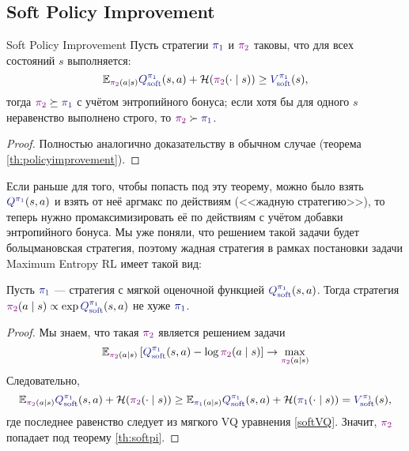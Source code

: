 \subsection{Soft Policy Improvement}

\begin{theoremBox}[label=th:softpi]{Soft Policy Improvement}
Пусть стратегии $\textcolor{ChadBlue}{\pi_1}$ и $\textcolor{ChadPurple}{\pi_2}$ таковы, что для всех состояний $s$ выполняется:
$$\E_{\textcolor{ChadPurple}{\pi_2}(a \mid s)} \textcolor{ChadBlue}{Q^{\pi_1}_{\soft}}(s, a) + \entropy(\textcolor{ChadPurple}{\pi_2}(\cdot \mid s)) \ge \textcolor{ChadBlue}{V^{\pi_1}_{\soft}}(s),$$
тогда $\textcolor{ChadPurple}{\pi_2} \succeq \textcolor{ChadBlue}{\pi_1}$ с учётом энтропийного бонуса; если хотя бы для одного $s$ неравенство выполнено строго, то $\textcolor{ChadPurple}{\pi_2} \succ \textcolor{ChadBlue}{\pi_1}$.
\begin{proof}
Полностью аналогично доказательству в обычном случае (теорема \ref{th:policyimprovement}).
\end{proof}
\end{theoremBox}

Если раньше для того, чтобы попасть под эту теорему, можно было взять $\textcolor{ChadBlue}{Q^{\pi_1}}(s, a)$ и взять от неё аргмакс по действиям (<<жадную стратегию>>), то теперь нужно промаксимизировать её по действиям с учётом добавки энтропийного бонуса. Мы уже поняли, что решением такой задачи будет больцмановская стратегия, поэтому жадная стратегия в рамках постановки задачи Maximum Entropy RL имеет такой вид:

\begin{theorem}
Пусть $\textcolor{ChadBlue}{\pi_1}$ --- стратегия с мягкой оценочной функцией $\textcolor{ChadBlue}{Q^{\pi_1}_{\soft}}(s, a)$. Тогда стратегия $\textcolor{ChadPurple}{\pi_2}(a \mid s) \propto \exp \textcolor{ChadBlue}{Q^{\pi_1}_{\soft}}(s, a)$ не хуже $\textcolor{ChadBlue}{\pi_1}$.
\begin{proof}
Мы знаем, что такая $\textcolor{ChadPurple}{\pi_2}$ является решением задачи
$$\E_{\textcolor{ChadPurple}{\pi_2}(a \mid s)} \left[ \textcolor{ChadBlue}{Q^{\pi_1}_{\soft}}(s, a) - \log \textcolor{ChadPurple}{\pi_2}(a \mid s) \right] \to \max\limits_{\textcolor{ChadPurple}{\pi_2}(a \mid s)}
$$
Следовательно,
$$\E_{\textcolor{ChadPurple}{\pi_2}(a \mid s)} \textcolor{ChadBlue}{Q^{\pi_1}_{\soft}}(s, a) + \entropy(\textcolor{ChadPurple}{\pi_2}(\cdot \mid s)) \ge \E_{\textcolor{ChadBlue}{\pi_1}(a \mid s)} \textcolor{ChadBlue}{Q^{\pi_1}_{\soft}}(s, a) + \entropy(\textcolor{ChadBlue}{\pi_1}(\cdot \mid s)) = \textcolor{ChadBlue}{V^{\pi_1}_{\soft}}(s),$$
где последнее равенство следует из мягкого VQ уравнения \eqref{softVQ}. Значит, $\textcolor{ChadPurple}{\pi_2}$ попадает под теорему \ref{th:softpi}.
\end{proof}
\end{theorem}

